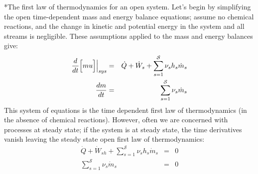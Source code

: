 \documentclass[11pt]{article}
\makeatletter
\theoremstyle{definition}
\renewcommand\subsection{\@startsection
	{subsection}{2}{0mm}
	{-0.05in}
	{0.5\baselineskip}
	{\normalfont\normalsize\bfseries}}
\makeatother
\begin{document}
\subsection*{The first law of thermodynamics for an open system.}
Let's begin by simplifying the open time-dependent mass and energy balance equations; assume no chemical reactions, and the change in kinetic and potential energy in the system and all streams is negligible.
These assumptions applied to the mass and energy balances give:
\begin{eqnarray}
	\frac{d}{dt}\Bigl[mu\Bigl]\Bigr|_{sys} &=& \dot{Q}+\dot{W}_{s} + \sum_{s=1}^{\mathcal{S}}\nu_{s}h_{s}\dot{m}_{s}\\
	\frac{dm}{dt} &=& \sum_{s=1}^{\mathcal{S}}\nu_{s}\dot{m}_{s}
\end{eqnarray}
This system of equations is the time dependent first law of thermodynamics (in the absence of chemical reactions).
However, often we are concerned with processes at steady state;
if the system is at steady state, the time derivatives vanish leaving the steady state open first law of thermodynamics:
\begin{eqnarray}
	\dot{Q}+\dot{W}_{sh} + \sum_{s=1}^{\mathcal{S}}\nu_{s}h_{s}\dot{m}_{s} & = & 0 \\
	\sum_{s=1}^{\mathcal{S}}\nu_{s}\dot{m}_{s} & = & 0
\end{eqnarray}
\end{document}
